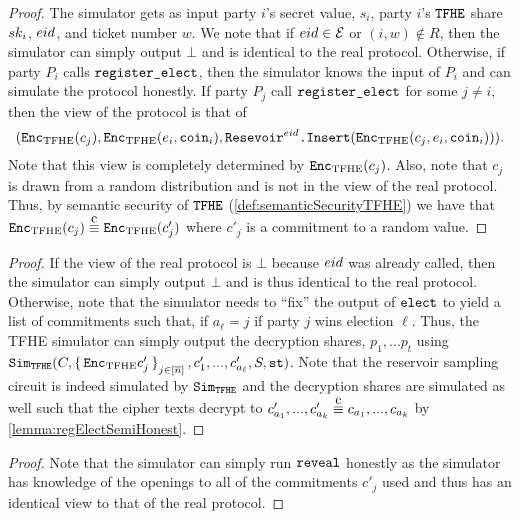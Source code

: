 \begin{lemma}
	\label{lemma:regElectSemiHonest}
	\begin{proof}
		The simulator gets as input party $i$'s secret value, $s_i$, party $i$'s ${\texttt{TFHE}}$ share $sk_i$,
		${eid}$, and ticket number $w$. We note that if ${eid} \in \mathcal{E}$ or $(i, w) \notin R$, then the simulator can simply output $\bot$ and
		is identical to the real protocol.
		Otherwise, if party $P_i$ calls $\texttt{register\_elect}$, then the simulator knows the input of $P_i$ and can simulate the protocol
		honestly. If party $P_j$ call $\texttt{register\_elect}$ for some $j \neq i$, then the view of the protocol
		is that of $$(\texttt{Enc}_{\mathrm{TFHE}}(c_j), \texttt{Enc}_{\mathrm{TFHE}}(e_i, \texttt{coin}_i), \texttt{Resevoir}^{{eid}}\texttt{.Insert}(\texttt{Enc}_{\mathrm{TFHE}}(c_j, e_i, \texttt{coin}_i))).$$
		Note that this view is completely determined by $\texttt{Enc}_{\mathrm{TFHE}}(c_j)$. Also, note that $c_j$ is drawn
		from a random distribution and is not in the view of the real protocol. Thus, 
		by semantic security of ${\texttt{TFHE}}$ (\cref{def:semanticSecurityTFHE}) we have that
		$\Enc(c_j) \compInd \Enc(c'_j)$ where $c'_j$ is a commitment to a random value.
	\end{proof}
\end{lemma}

\begin{lemma}
\begin{proof}
	If the view of the real protocol is $\bot$ because ${eid}$ was already called, then the simulator can simply output $\bot$
	and is thus identical to the real protocol.
	Otherwise, note that the simulator needs to ``fix'' the output of $\texttt{elect}$ to yield
	a list of commitments such that, if $a_\ell = j$ if party $j$ wins election $\ell$.
	Thus, the TFHE simulator can simply output the decryption shares, $p_1, ... p_t$ using $\texttt{Sim}_{{\texttt{TFHE}}}(C, \set{\texttt{Enc}_{\mathrm{TFHE}}{c'_j}}_{j \in [\overline{n}]}, c'_1, ..., c'_{a_\ell}, S, \texttt{st})$.
	Note that the reservoir sampling circuit is indeed simulated by $\texttt{Sim}_{{\texttt{TFHE}}}$
	and the decryption shares are simulated as well such that the cipher texts decrypt
	to $c'_{a_1}, ..., c'_{a_k} \compInd c_{a_1}, ..., c_{a_k}$ by \cref{lemma:regElectSemiHonest}.
\end{proof}	
\end{lemma}

\begin{lemma}
	\begin{proof}
		Note that the simulator can simply run $\texttt{reveal}$ honestly as the simulator has knowledge of the openings to all of the commitments $c'_j$ used
		and thus has an identical view to that of the real protocol.
	\end{proof}
	
\end{lemma}


